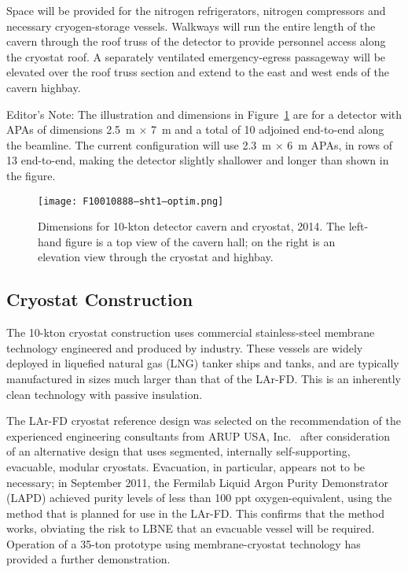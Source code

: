 Space will be provided for the nitrogen refrigerators, nitrogen compressors and necessary 
cryogen-storage vessels. Walkways will run the entire length of the cavern through the roof truss of the detector to 
provide personnel access along the cryostat roof. A separately ventilated emergency-egress passageway will be elevated over the roof truss section and extend to the east and west ends of the cavern highbay.

\begin{editornote}
  Editor's Note:  The illustration and dimensions in Figure~\ref{fig:v5ch2-cavern-cryostat-section-2014} are for a detector with APAs of dimensions 2.5~m $\times$ 7~m and a total of 10 adjoined end-to-end along the beamline.  The current configuration will use 2.3~m $\times$ 6~m APAs, in rows of 13 end-to-end, making the detector slightly shallower and longer than shown in the figure.  
\end{editornote}


\begin{figure}[htbp]
\centering
\texttt{[image: F10010888--sht1--optim.png]}
\caption[Dimensions for 10-kton detector cavern and cryostat, 2014]{Dimensions for 10-kton detector cavern 
and cryostat, 2014. The left-hand figure is a top view of the cavern hall; on the right is an elevation view 
through the cryostat and highbay. 
}
\label{fig:v5ch2-cavern-cryostat-section-2014}
\end{figure}


\subsection{Cryostat Construction}
\label{ch1:cryo-constr}

The 10-kton cryostat construction uses commercial stainless-steel membrane technology engineered and produced by 
industry. These vessels are widely deployed in liquefied natural gas (LNG) tanker ships and 
tanks, and are typically manufactured in sizes much larger than that of the LAr-FD.  This is an inherently clean technology with passive insulation.

The LAr-FD cryostat reference design was selected on the recommendation of the experienced engineering consultants from ARUP USA, Inc.~\cite{docdb4314} after consideration of an alternative design that uses segmented, internally self-supporting, evacuable, modular cryostats.  Evacuation, in particular, appears not to be necessary; in September 2011, the Fermilab Liquid Argon Purity Demonstrator (LAPD)  achieved
 purity levels of less than 100 ppt oxygen-equivalent, using the method that is planned for use in the LAr-FD. This confirms that the 
method works, obviating the risk to LBNE that an evacuable vessel will be
 required. Operation of a 35-ton prototype using membrane-cryostat technology has provided a further demonstration.


